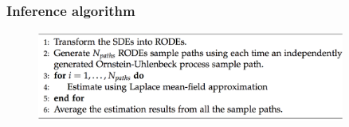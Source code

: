 \begin{frame}[t]
	\frametitle{Inference algorithm}
    \vspace{2\baselineskip}
    \begin{figure}
        \centering
        \includegraphics[width=0.9\textwidth]{graphics/lpmf-sde-algorithm}                    
    \end{figure}            
\end{frame}